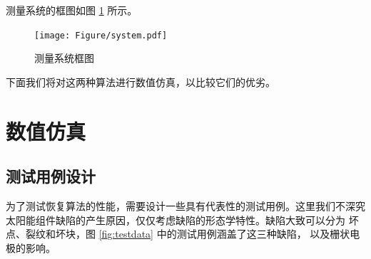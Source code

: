 测量系统的框图如图 \ref{fig:system} 所示。

\begin{figure}
\centering
\texttt{[image: Figure/system.pdf]}
\caption{测量系统框图}
\label{fig:system}
\end{figure}

下面我们将对这两种算法进行数值仿真，以比较它们的优劣。

\section{数值仿真}

\subsection{测试用例设计}

为了测试恢复算法的性能，需要设计一些具有代表性的测试用例。这里我们不深究
太阳能组件缺陷的产生原因，仅仅考虑缺陷的形态学特性。缺陷大致可以分为
坏点、裂纹和坏块，图 \ref{fig:testdata} 中的测试用例涵盖了这三种缺陷，
以及栅状电极的影响。

